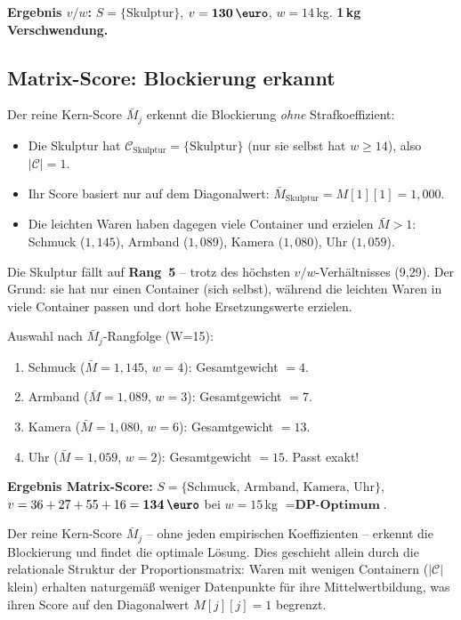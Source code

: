 \documentclass[a4paper,11pt]{article}
\begin{document}
\noindent
\textbf{Ergebnis $v/w$:} $S = \{\text{Skulptur}\}$,
$v = \textbf{130\,\euro}$, $w = 14$\,kg.
\textbf{1\,kg Verschwendung.}

\subsection{Matrix-Score: Blockierung erkannt}

Der reine Kern-Score $\bar{M}_j$ erkennt die Blockierung
\emph{ohne} Strafkoeffizient:
\begin{itemize}[leftmargin=*,topsep=2pt]
  \item Die Skulptur hat $\mathcal{C}_{\text{Skulptur}} = \{\text{Skulptur}\}$
    (nur sie selbst hat $w \ge 14$), also $|\mathcal{C}| = 1$.
  \item Ihr Score basiert nur auf dem Diagonalwert:
    $\bar{M}_{\text{Skulptur}} = M[1][1] = 1{,}000$.
  \item Die leichten Waren haben dagegen viele Container
    und erzielen $\bar{M} > 1$: Schmuck ($1{,}145$),
    Armband ($1{,}089$), Kamera ($1{,}080$), Uhr ($1{,}059$).
\end{itemize}

\noindent
Die Skulptur fällt auf \textbf{Rang~5} -- trotz des höchsten
$v/w$-Verhältnisses (9{,}29). Der Grund: sie hat nur
einen Container (sich selbst), während die leichten Waren
in viele Container passen und dort hohe Ersetzungswerte erzielen.

\medskip
\noindent
Auswahl nach $\bar{M}_j$-Rangfolge (W=15):
\begin{enumerate}[topsep=2pt]
  \item Schmuck ($\bar{M}=1{,}145$, $w=4$): Gesamtgewicht $= 4$.
  \item Armband ($\bar{M}=1{,}089$, $w=3$): Gesamtgewicht $= 7$.
  \item Kamera ($\bar{M}=1{,}080$, $w=6$): Gesamtgewicht $= 13$.
  \item Uhr ($\bar{M}=1{,}059$, $w=2$): Gesamtgewicht $= 15$. Passt exakt!
\end{enumerate}

\noindent
\textbf{Ergebnis Matrix-Score:}
$S = \{\text{Schmuck, Armband, Kamera, Uhr}\}$,
$v = 36+27+55+16 = \textbf{134\,\euro}$ bei $w = 15$\,kg
$= \textbf{DP-Optimum}$.

\medskip
\noindent
Der reine Kern-Score $\bar{M}_j$ -- ohne jeden empirischen
Koeffizienten -- erkennt die Blockierung und findet die
optimale Lösung. Dies geschieht allein durch die relationale
Struktur der Proportionsmatrix: Waren mit wenigen Containern
($|\mathcal{C}|$ klein) erhalten naturgemäß weniger
Datenpunkte für ihre Mittelwertbildung, was ihren Score
auf den Diagonalwert $M[j][j]=1$ begrenzt.
\end{document}

